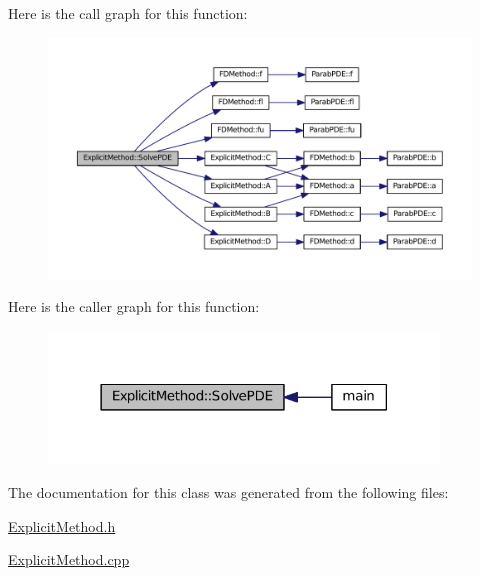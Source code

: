 Here is the call graph for this function\+:\nopagebreak
\begin{figure}[H]
\begin{center}
\leavevmode
\includegraphics[width=350pt]{classExplicitMethod_ac2c2d5bac3fc414851c2810ff916c2d6_cgraph}
\end{center}
\end{figure}




Here is the caller graph for this function\+:\nopagebreak
\begin{figure}[H]
\begin{center}
\leavevmode
\includegraphics[width=294pt]{classExplicitMethod_ac2c2d5bac3fc414851c2810ff916c2d6_icgraph}
\end{center}
\end{figure}




The documentation for this class was generated from the following files\+:\begin{DoxyCompactItemize}
\item 
\hyperlink{ExplicitMethod_8h}{Explicit\+Method.\+h}\item 
\hyperlink{ExplicitMethod_8cpp}{Explicit\+Method.\+cpp}\end{DoxyCompactItemize}
